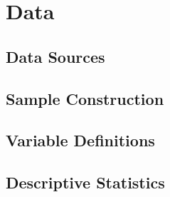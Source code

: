 \section{Data}

\subsection{Data Sources}

\subsection{Sample Construction}

\subsection{Variable Definitions}

\subsection{Descriptive Statistics}
%   
